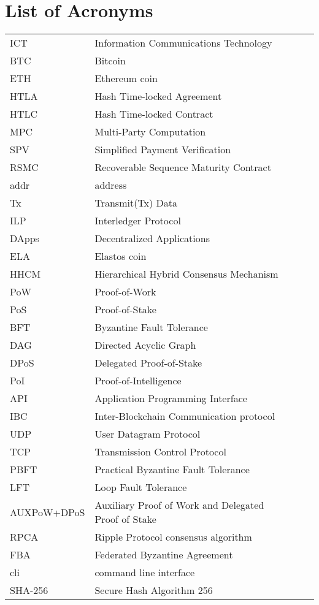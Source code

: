 \chapter{List of Acronyms}

\begin{table}[h]
\begin{tabular}{p{2.7cm}lp{8cm}l}

ICT              & Information Communications Technology \\
BTC              & Bitcoin \\ 	
ETH              & Ethereum coin\\
HTLA             & Hash Time-locked Agreement \\
HTLC             & Hash Time-locked Contract \\ 	
MPC              & Multi-Party Computation \\
SPV              & Simplified Payment Verification \\ 	
RSMC             & Recoverable Sequence Maturity Contract \\
addr             & address\\
Tx               & Transmit(Tx) Data \\
ILP              & Interledger Protocol \\ 	
DApps            & Decentralized Applications \\
ELA              & Elastos coin\\	
HHCM             & Hierarchical Hybrid Consensus Mechanism\\
PoW              & Proof-of-Work\\
PoS              & Proof-of-Stake\\
BFT              & Byzantine Fault Tolerance\\
DAG              & Directed Acyclic Graph\\
DPoS             & Delegated Proof-of-Stake\\
PoI              & Proof-of-Intelligence\\
API              & Application Programming Interface\\
IBC              & Inter-Blockchain Communication protocol\\
UDP              & User Datagram Protocol\\
TCP              & Transmission Control Protocol\\
PBFT             & Practical Byzantine Fault Tolerance\\
LFT              & Loop Fault Tolerance\\
AUXPoW+DPoS	 	 & Auxiliary Proof of Work and Delegated Proof of Stake\\
RPCA			 & Ripple Protocol consensus algorithm \\
FBA				 & Federated Byzantine Agreement\\
cli				 & command line interface\\
SHA-256 		 & Secure Hash Algorithm 256\\
\end{tabular}
\end{table}